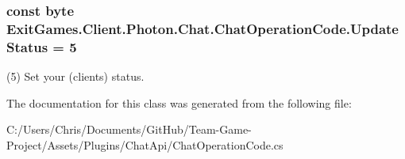 \subsubsection[{\texorpdfstring{Update\+Status}{UpdateStatus}}]{\setlength{\rightskip}{0pt plus 5cm}const byte Exit\+Games.\+Client.\+Photon.\+Chat.\+Chat\+Operation\+Code.\+Update\+Status = 5}\hypertarget{class_exit_games_1_1_client_1_1_photon_1_1_chat_1_1_chat_operation_code_a76eac50d9c1919c0dfd65cde6d0f2464}{}\label{class_exit_games_1_1_client_1_1_photon_1_1_chat_1_1_chat_operation_code_a76eac50d9c1919c0dfd65cde6d0f2464}


(5) Set your (client\textquotesingle{}s) status.



The documentation for this class was generated from the following file\+:\begin{DoxyCompactItemize}
\item 
C\+:/\+Users/\+Chris/\+Documents/\+Git\+Hub/\+Team-\/\+Game-\/\+Project/\+Assets/\+Plugins/\+Chat\+Api/Chat\+Operation\+Code.\+cs\end{DoxyCompactItemize}
